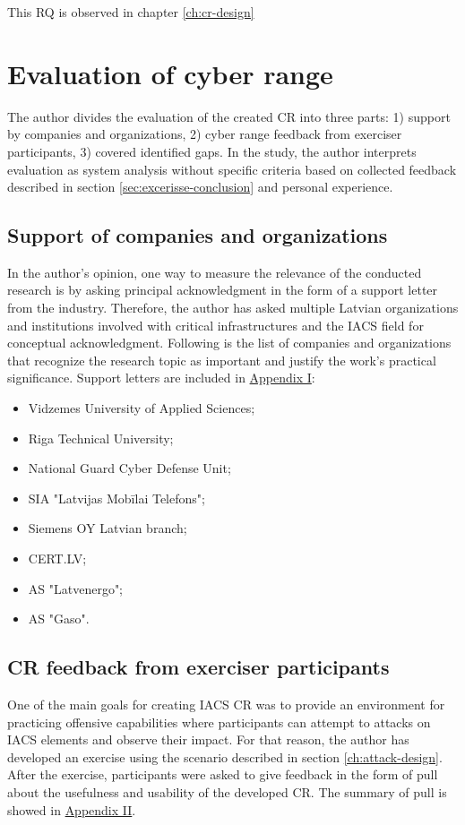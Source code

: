 This RQ is observed in chapter \ref{ch:cr-design}

\section{Evaluation of cyber range}

The author divides the evaluation of the created CR into three parts: 1) support by companies and organizations, 2) cyber range feedback from exerciser participants, 3) covered identified gaps. In the study, the author interprets evaluation as system analysis without specific criteria based on collected feedback described in section \ref{sec:excerisse-conclusion} and personal experience. 

\subsection{Support of companies and organizations}

In the author's opinion, one way to measure the relevance of the conducted research is by asking principal acknowledgment in the form of a support letter from the industry. Therefore, the author has asked multiple Latvian organizations and institutions involved with critical infrastructures and the IACS field for conceptual acknowledgment. Following is the list of companies and organizations that recognize the research topic as important and justify the work's practical significance. Support letters are included in  \hyperlink{page.82}{Appendix I}:

\begin{itemize}
	\item Vidzemes University of Applied Sciences;
	\item Riga Technical University;
	\item National Guard Cyber Defense Unit;
	\item SIA "Latvijas Mobīlai Telefons";
	\item Siemens OY Latvian branch;
	\item CERT.LV;
	\item AS "Latvenergo";
	\item AS "Gaso".
\end{itemize}


\subsection{CR feedback from exerciser participants}

One of the main goals for creating IACS CR was to provide an environment for practicing offensive capabilities where participants can attempt to attacks on IACS elements and observe their impact. For that reason, the author has developed an exercise using the scenario described in section \ref{ch:attack-design}. After the exercise, participants were asked to give feedback in the form of pull about the usefulness and usability of the developed CR. The summary of pull is showed in \hyperlink{page.91}{Appendix II}. 

